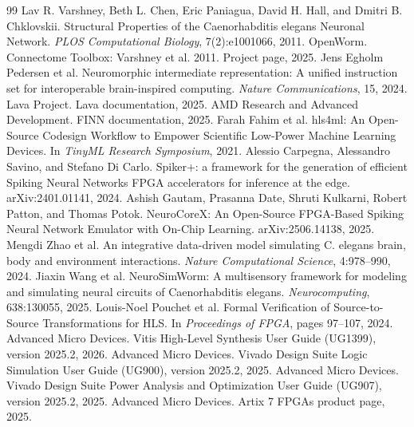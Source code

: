 \documentclass[11pt]{article}
\begin{document}
\begin{thebibliography}{99}
 Lav R. Varshney, Beth L. Chen, Eric Paniagua, David H. Hall, and Dmitri B. Chklovskii. Structural Properties of the Caenorhabditis elegans Neuronal Network. \emph{PLOS Computational Biology}, 7(2):e1001066, 2011.
 OpenWorm. Connectome Toolbox: Varshney et al. 2011. Project page, 2025.
 Jens Egholm Pedersen et al. Neuromorphic intermediate representation: A unified instruction set for interoperable brain-inspired computing. \emph{Nature Communications}, 15, 2024.
 Lava Project. Lava documentation, 2025.
 AMD Research and Advanced Development. FINN documentation, 2025.
 Farah Fahim et al. hls4ml: An Open-Source Codesign Workflow to Empower Scientific Low-Power Machine Learning Devices. In \emph{TinyML Research Symposium}, 2021.
 Alessio Carpegna, Alessandro Savino, and Stefano Di Carlo. Spiker+: a framework for the generation of efficient Spiking Neural Networks FPGA accelerators for inference at the edge. arXiv:2401.01141, 2024.
 Ashish Gautam, Prasanna Date, Shruti Kulkarni, Robert Patton, and Thomas Potok. NeuroCoreX: An Open-Source FPGA-Based Spiking Neural Network Emulator with On-Chip Learning. arXiv:2506.14138, 2025.
 Mengdi Zhao et al. An integrative data-driven model simulating C. elegans brain, body and environment interactions. \emph{Nature Computational Science}, 4:978--990, 2024.
 Jiaxin Wang et al. NeuroSimWorm: A multisensory framework for modeling and simulating neural circuits of Caenorhabditis elegans. \emph{Neurocomputing}, 638:130055, 2025.
 Louis-Noel Pouchet et al. Formal Verification of Source-to-Source Transformations for HLS. In \emph{Proceedings of FPGA}, pages 97--107, 2024.
 Advanced Micro Devices. Vitis High-Level Synthesis User Guide (UG1399), version 2025.2, 2026.
 Advanced Micro Devices. Vivado Design Suite Logic Simulation User Guide (UG900), version 2025.2, 2025.
 Advanced Micro Devices. Vivado Design Suite Power Analysis and Optimization User Guide (UG907), version 2025.2, 2025.
 Advanced Micro Devices. Artix 7 FPGAs product page, 2025.
\end{thebibliography}
\end{document}
